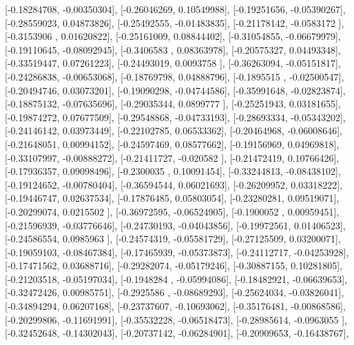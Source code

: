 \documentclass{article}
\begin{document}
       [-0.18284708, -0.00350304],
       [-0.26046269,  0.10549988],
       [-0.19251656, -0.05390267],
       [-0.28559023,  0.04873826],
       [-0.25492555, -0.01483835],
       [-0.21178142, -0.0583172 ],
       [-0.3153906 ,  0.01620822],
       [-0.25161009,  0.08844402],
       [-0.31054855, -0.06679979],
       [-0.19110645, -0.08092945],
       [-0.3406583 ,  0.08363978],
       [-0.20575327,  0.04493348],
       [-0.33519447,  0.07261223],
       [-0.24493019,  0.0093758 ],
       [-0.36263094, -0.05151817],
       [-0.24286838, -0.00653068],
       [-0.18769798,  0.04888796],
       [-0.1895515 , -0.02500547],
       [-0.20494746,  0.03073201],
       [-0.19090298, -0.04744586],
       [-0.35991648, -0.02823874],
       [-0.18875132, -0.07635696],
       [-0.29035344,  0.0899777 ],
       [-0.25251943,  0.03181655],
       [-0.19874272,  0.07677509],
       [-0.29548868, -0.04733193],
       [-0.28693334, -0.05343202],
       [-0.24146142,  0.03973449],
       [-0.22102785,  0.06533362],
       [-0.20464968, -0.06008646],
       [-0.21648051,  0.00994152],
       [-0.24597469,  0.08577662],
       [-0.19156969,  0.04969818],
       [-0.33107997, -0.00888272],
       [-0.21411727, -0.020582  ],
       [-0.21472419,  0.10766426],
       [-0.17936357,  0.09098496],
       [-0.2300035 ,  0.10091454],
       [-0.33244813, -0.08438102],
       [-0.19124652, -0.00780404],
       [-0.36594544,  0.06021693],
       [-0.26209952,  0.03318222],
       [-0.19446747,  0.02637534],
       [-0.17876485,  0.05803054],
       [-0.23280281,  0.09519071],
       [-0.20299074,  0.0215502 ],
       [-0.36972595, -0.06524905],
       [-0.1900052 ,  0.00959451],
       [-0.21596939, -0.03776646],
       [-0.24730193, -0.04043856],
       [-0.19972561,  0.01406523],
       [-0.24586554,  0.0985963 ],
       [-0.24574319, -0.05581729],
       [-0.27125509,  0.03200071],
       [-0.19059103, -0.08467384],
       [-0.17465939, -0.05373873],
       [-0.24112717, -0.04253928],
       [-0.17471562,  0.03688716],
       [-0.29282074, -0.05179246],
       [-0.30887155,  0.10281805],
       [-0.21203518, -0.05197034],
       [-0.1948284 , -0.05994086],
       [-0.18482921, -0.06639653],
       [-0.32472426,  0.00985751],
       [-0.2925586 , -0.08689293],
       [-0.25624034, -0.03826041],
       [-0.34894294,  0.06207168],
       [-0.23737607, -0.10693062],
       [-0.35176481, -0.00868586],
       [-0.20299806, -0.11691991],
       [-0.35532228, -0.06518473],
       [-0.28985614, -0.0963055 ],
       [-0.32452648, -0.14302043],
       [-0.20737142, -0.06284901],
       [-0.20909653, -0.16438767],
\end{document}
